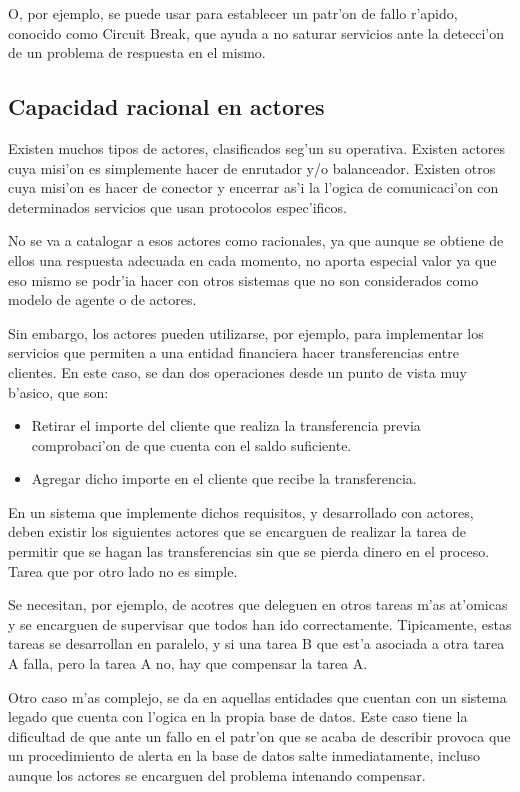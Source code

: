 \documentclass[12pt]{article}
\begin{document}
O, por ejemplo, se puede usar para establecer un patr'on de fallo r'apido, conocido como
Circuit Break, que ayuda a no saturar servicios ante la detecci'on de un problema de respuesta
en el mismo.

\subsection{Capacidad racional en actores}
\label{sub:capacidad racional en actores}
Existen muchos tipos de actores, clasificados seg'un su operativa. Existen actores cuya misi'on
es simplemente hacer de enrutador y/o balanceador. Existen otros cuya misi'on es hacer de conector y
encerrar as'i la l'ogica de comunicaci'on con determinados servicios que usan protocolos espec'ificos.

No se va a catalogar a esos actores como racionales, ya que aunque se obtiene de ellos una respuesta
adecuada en cada momento, no aporta especial valor ya que eso mismo se podr'ia hacer con otros sistemas
que no son considerados como modelo de agente o de actores.

Sin embargo, los actores pueden utilizarse, por ejemplo, para implementar los servicios que permiten
a una entidad financiera hacer transferencias entre clientes. En este caso, se dan dos operaciones desde
un punto de vista muy b'asico, que son:

\begin{itemize}
	\item Retirar el importe del cliente que realiza la transferencia previa comprobaci'on
    de que cuenta con el saldo suficiente.
	\item Agregar dicho importe en el cliente que recibe la transferencia.
\end{itemize}

En un sistema que implemente dichos requisitos, y desarrollado con actores, deben existir los siguientes
actores que se encarguen de realizar la tarea de permitir que se hagan las transferencias sin
que se pierda dinero en el proceso. Tarea que por otro lado no es simple.

Se necesitan, por ejemplo, de acotres que deleguen en otros tareas m'as at'omicas y se encarguen de
supervisar que todos han ido correctamente. Tipicamente, estas tareas se desarrollan en paralelo, y si
una tarea B que est'a asociada a otra tarea A falla, pero la tarea A no, hay que compensar la tarea A.

Otro caso m'as complejo, se da en aquellas entidades que cuentan con un sistema legado que cuenta
con l'ogica en la propia base de datos. Este caso tiene la dificultad de que ante un fallo en el patr'on
que se acaba de describir provoca que un procedimiento de alerta en la base de datos salte
inmediatamente, incluso aunque los actores se encarguen del problema intenando compensar.
\end{document}
